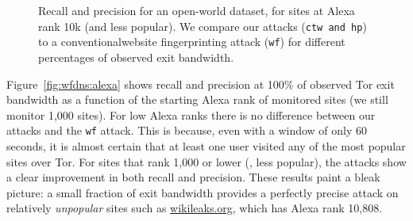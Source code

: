 \begin{figure}[t]
\centering
{}
\caption{Recall and precision for an open-world dataset, for sites
at Alexa rank 10k (and less popular). We compare our attacks (\texttt{ctw and
 \texttt{hp}}) to a conventionalwebsite fingerprinting attack (\texttt{wf}) for different
 percentages of observed exit bandwidth. }
\label{fig:wfdns:torpct}
\end{figure}


Figure~\ref{fig:wfdns:alexa} shows recall and precision at 100\% of
observed Tor exit bandwidth as a function of the starting Alexa rank of
monitored sites (we still monitor 1,000 sites).
For low Alexa ranks there is no difference between our attacks and the
\texttt{wf} attack. This is because, even with a window of only 60 seconds,
it is almost certain that at least one user visited any of the most popular
sites over Tor. For sites that rank 1,000 or lower (\ie, less popular),
the \name attacks show a clear improvement in both recall and precision.
These results paint a bleak picture: a small fraction of exit
bandwidth provides a perfectly precise attack on relatively
\emph{unpopular} sites such as \url{wikileaks.org}, which has Alexa rank
10,808. 


